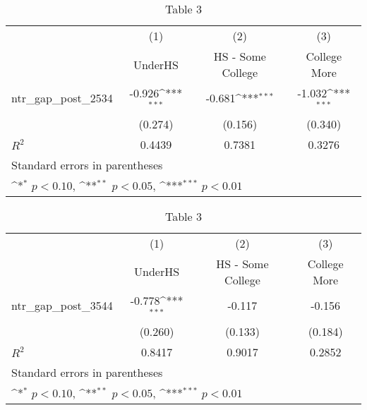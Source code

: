 \begin{table}[htbp]\centering
\def\sym#1{\ifmmode^{#1}\else\(^{#1}\)\fi}
\caption{Table 3}
\begin{tabular}{l*{3}{c}}
\toprule
                    &\multicolumn{1}{c}{(1)}&\multicolumn{1}{c}{(2)}&\multicolumn{1}{c}{(3)}\\
                    &\multicolumn{1}{c}{UnderHS}&\multicolumn{1}{c}{HS - Some College}&\multicolumn{1}{c}{College More}\\
\midrule
ntr\_gap\_post\_2534   &   -0.926\sym{***}&   -0.681\sym{***}&   -1.032\sym{***}\\
                    &  (0.274)         &  (0.156)         &  (0.340)         \\
\midrule
\(R^{2}\)           &   0.4439         &   0.7381         &   0.3276         \\
\bottomrule
\multicolumn{4}{l}{\footnotesize Standard errors in parentheses}\\
\multicolumn{4}{l}{\footnotesize \sym{*} \(p<0.10\), \sym{**} \(p<0.05\), \sym{***} \(p<0.01\)}\\
\end{tabular}
\end{table}
\begin{table}[htbp]\centering
\def\sym#1{\ifmmode^{#1}\else\(^{#1}\)\fi}
\caption{Table 3}
\begin{tabular}{l*{3}{c}}
\toprule
                    &\multicolumn{1}{c}{(1)}&\multicolumn{1}{c}{(2)}&\multicolumn{1}{c}{(3)}\\
                    &\multicolumn{1}{c}{UnderHS}&\multicolumn{1}{c}{HS - Some College}&\multicolumn{1}{c}{College More}\\
\midrule
ntr\_gap\_post\_3544   &   -0.778\sym{***}&   -0.117         &   -0.156         \\
                    &  (0.260)         &  (0.133)         &  (0.184)         \\
\midrule
\(R^{2}\)           &   0.8417         &   0.9017         &   0.2852         \\
\bottomrule
\multicolumn{4}{l}{\footnotesize Standard errors in parentheses}\\
\multicolumn{4}{l}{\footnotesize \sym{*} \(p<0.10\), \sym{**} \(p<0.05\), \sym{***} \(p<0.01\)}\\
\end{tabular}
\end{table}
